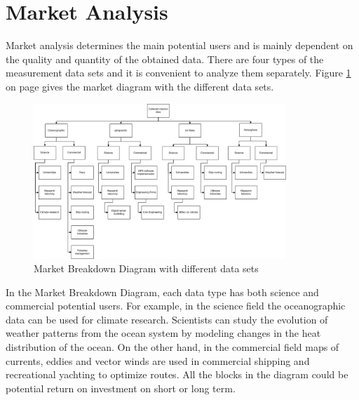 \section{Market Analysis}
  \label{blMAanalysis}
Market analysis determines the main potential users and is mainly dependent on the quality and quantity of the obtained data. There are four types of the measurement data sets and it is convenient to analyze them separately. Figure \ref{MA} on page \pageref{MA} gives the market diagram with the different data sets.
\begin{figure} [ht]
	\begin{center}
 \includegraphics[width=0.85\textwidth,angle=0]{chapters/img/Market_analysis.jpg}	
	\caption{Market Breakdown Diagram with different data sets \cite{Market}}
	\label{MA}
	\end{center}
\end{figure}


In the Market Breakdown Diagram, each data type has both science and commercial potential users. For example, in the science field the oceanographic data can be used for climate research. Scientists can study the evolution of weather patterns from the ocean system by modeling changes in the heat distribution of the ocean. On the other hand, in the commercial field maps of currents, eddies and vector winds are used in commercial shipping and recreational yachting to optimize routes. All the blocks in the diagram could be potential return on investment on short or long term.
